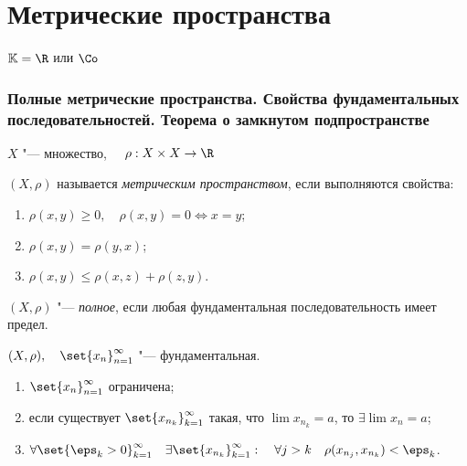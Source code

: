 \part{Метрические пространства}

\begin{notation}
	$ \mathbb K = \R $ или $ \Co $
\end{notation}

\section{Полные метрические пространства.
Свойства фундаментальных последовательностей.
Теорема о замкнутом подпространстве}

\begin{definition}
	$ X $ "--- множество, $ \quad \rho : X \times X \to \R $

	$ (X, \rho) $ называется \emph{метрическим пространством}, если выполняются свойства:
	\begin{enumerate}
		\item $ \rho(x, y) \ge 0, \quad \rho(x, y) = 0 \iff x = y $;
		\item $ \rho(x, y) = \rho(y, x) $;
		\item $ \rho(x, y) \le \rho(x, z) + \rho(z, y) $.
	\end{enumerate}
\end{definition}

\begin{definition}
	$ (X, \rho) $ "--- \emph{полное}, если любая фундаментальная последовательность имеет предел.
\end{definition}

\begin{properties}
	$ (X, \rho), \quad \set{x_n}_{n = 1}^\infty $ "--- фундаментальная.

	\begin{enumerate}
		\item $ \set{x_n}_{n = 1}^\infty $ ограничена;
		\item если существует $ \set{x_{n_k}}_{k = 1}^\infty $ такая, что $ \lim x_{n_k} = a $, то $ \exists \lim x_n = a $;
		\item $ \forall \set{\eps_k > 0}_{k = 1}^\infty \quad
			\exists \set{x_{n_k}}_{k = 1}^\infty : \quad
			\forall j > k \quad \rho(x_{n_j}, x_{n_k}) < \eps_k $.
	\end{enumerate}
\end{properties}

